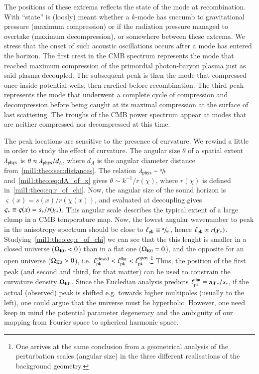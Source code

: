     The positions of these extrema reflects the state of the mode at recombination. With ``state'' is (loosly) meant whether a $k$-mode has succumb to gravitational pressure (maximum compression) or if the radiation pressure managed to overtake (maximum decompression), or somewhere between these extrema. We stress that the onset of such acoustic oscillations occurs after a mode has entered the horizon. The first crest in the CMB spectrum represents the mode that reached maximum compression of the primordial photon-baryon plasma just as said plasma decoupled. The subsequent peak is then the mode that compressed once inside potential wells, then rarefied before recombination. The third peak represents the mode that underwent a complete cycle of compression and decompression before being caught at its maximal compression at the surface of last scattering. The troughs of the CMB power spectrum appear at modes that are neither compressed nor decompressed at this time. 

    The peak locations are sensitive to the presence of curvature. We rewind a little in order to study the effect of curvature. The angular size $\theta$ of a spatial extent $\lambda_\mathrm{phys}$ is $\theta\approx\lambda_\mathrm{phys}/d_A$, where $d_A$ is the angular diameter distance from~\cref{mil1:theo:sec:distances}. The relation $\lambda_\mathrm{phys} \sim \sfrac{a}{k}$ and~\cref{mil1:theo:eq:dA_of_x} gives $\theta \sim k^{-1}/r(\chi) $, where $r(\chi)$ is defined in~\cref{mil1:theo:eq:r_of_chi}. Now, the angular size of the sound horizon is $\varsigma(x) = s(x)/r(\chi(x))$, and evaluated at decoupling gives $\varsigma_*\equiv \varsigma(x)=s_*/r(\chi_*)$. This angular scale describes the typical extent of a large clump in a CMB temperature map. Now, the lowest angular wavenumber to peak in the anisotropy spectrum should be close to $\ell_\mathrm{pk}\equiv \sfrac{\pi}{\varsigma_*}$, hence $\ell_\mathrm{pk}\propto r(\chi_*) $. Studying~\cref{mil1:theo:eq:r_of_chi} we can see that the this lenght is smaller in a closed universe ($\Omega_{\mathrm{K}0} < 0$) than in a flat one ($\Omega_{\mathrm{K}0} = 0$), and the opposite for an open universe ($\Omega_{\mathrm{K}0} > 0$), i.e. $\ell_\mathrm{pk}^\mathrm{closed}< \ell_\mathrm{pk}^\mathrm{flat}<\ell_\mathrm{pk}^\mathrm{open}$.\footnote{One arrives at the same conclusion from a geometrical analysis of the perturbation scales (angular size) in the three different realisations of the background geometry.} Thus, the position of the first peak (and second and third, for that matter) can be used to constrain the curvature density $\Omega_{\mathrm{K}0}$. Since the Eucledian analysis predicts $\ell_\mathrm{pk}^\mathrm{flat} = \pi \chi_*/s_*$, if the actual (observed) peak is shifted e.g. towards higher multipoles (usually to the left), one could argue that the universe must be hyperbolic. However, one need keep in mind the potential parameter degeneracy and the ambiguity of our mapping from Fourier space to spherical harmonic space. %

